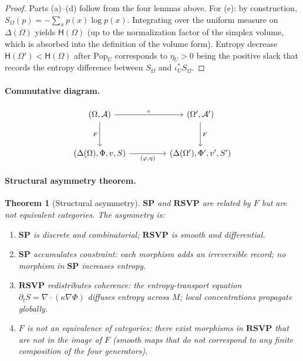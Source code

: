 \documentclass[12pt,a4paper]{article}
\newtheorem{theorem}{Theorem}[section]
\theoremstyle{definition}
\theoremstyle{remark}
\newcommand{\Ent}{\mathsf{H}}
\newcommand{\SP}{\mathbf{SP}}
\newcommand{\RSVP}{\mathbf{RSVP}}
\newcommand{\Pop}{\mathrm{Pop}}
\newcommand{\PhiF}{\Phi}
\newcommand{\vF}{v}
\newcommand{\SF}{S}
\begin{document}
\begin{proof}
Parts (a)--(d) follow from the four lemmas above. For (e): by construction,
$\SF_\Omega(p)=-\sum_x p(x)\log p(x)$. Integrating over the uniform measure on
$\Delta(\Omega)$ yields $\Ent(\Omega)$ (up to the normalization factor of the simplex
volume, which is absorbed into the definition of the volume form). Entropy decrease
$\Ent(\Omega')<\Ent(\Omega)$ after $\Pop_U$ corresponds to $\eta_U>0$ being the
positive slack that records the entropy difference between $\SF_\Omega$ and
$\iota_U^*\SF_\Omega$.
\end{proof}

\paragraph{Commutative diagram.}
\[
\begin{tikzcd}[column sep=4.5em, row sep=3em]
  (\Omega,\mathcal{A})
  \arrow[r,"e"]
  \arrow[d,"F"']
  &
  (\Omega',\mathcal{A}')
  \arrow[d,"F"]
  \\
  (\Delta(\Omega),\PhiF,\vF,\SF)
  \arrow[r,"{(\varphi,\eta)}"']
  &
  (\Delta(\Omega'),\PhiF',\vF',\SF')
\end{tikzcd}
\]

\paragraph{Structural asymmetry theorem.}

\begin{theorem}[Structural asymmetry]
\label{thm:asymmetry}
$\SP$ and $\RSVP$ are related by $F$ but are not equivalent categories. The asymmetry
is:
\begin{enumerate}[label=(\roman*)]
\item $\SP$ is discrete and combinatorial; $\RSVP$ is smooth and differential.
\item $\SP$ \emph{accumulates constraint}: each morphism adds an irreversible record;
  no morphism in $\SP$ increases entropy.
\item $\RSVP$ \emph{redistributes coherence}: the entropy-transport equation
  $\partial_t\SF=\nabla\cdot(\kappa\nabla\PhiF)$ diffuses entropy across $M$; local
  concentrations propagate globally.
\item $F$ is not an equivalence of categories: there exist morphisms in $\RSVP$ that
  are not in the image of $F$ (smooth maps that do not correspond to any finite
  composition of the four generators).
\end{enumerate}
\end{theorem}
\end{document}
